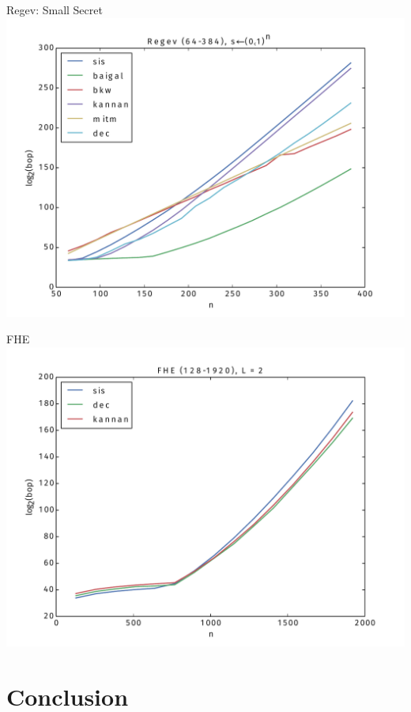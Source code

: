 \documentclass[10pt,compress]{beamer}
\begin{document}
\begin{frame}{Regev: Small Secret}
  \vspace{-1em}
  \includegraphics[width=1.0\textwidth]{Regev-(0,1)-64-384.pdf}
\end{frame}


\begin{frame}{FHE}
  \vspace{-1em}
  \includegraphics[width=1.0\textwidth]{FHE-2-128-1920.pdf}
\end{frame}


\section{Conclusion}
\end{document}
